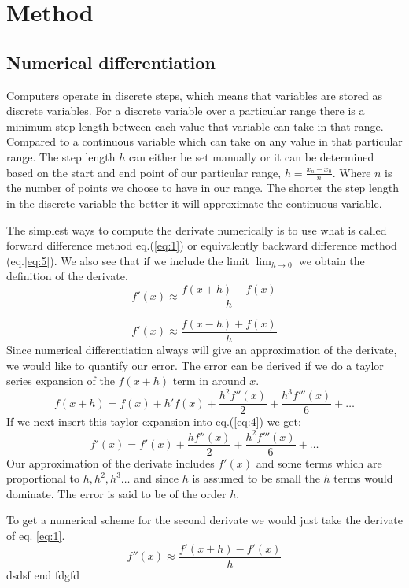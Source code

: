\section*{Method}
\subsection*{Numerical differentiation}
\par Computers operate in discrete steps, which means that variables are stored as discrete variables. For a discrete variable over a particular range there is a minimum step length between each value that variable can take in that range. Compared to a continuous variable which can take on any value in that particular range. The step length $h$ can either be set manually or it can be determined based on the start and end point of our particular range, $h = \frac{x_n -x_0}{n}$. Where $n$ is the number of points we choose to have in our range. The shorter the step length in the discrete variable the better it will approximate the continuous variable.  
\par
The simplest ways to compute the derivate numerically is to use what is called forward difference method eq.(\ref{eq:1}) or equivalently backward difference method (eq.\ref{eq:5}). We also see that if we include the limit $\lim_{h\to 0}$ we obtain the definition of the derivate. 
\begin{equation}\label{eq:1}
    f'(x) \approx \frac{f(x+h)-f(x)}{h}
\end{equation}

\begin{equation}\label{eq:5}
  f'(x) \approx \frac{f(x-h)+f(x)}{h}
\end{equation}
Since numerical differentiation always will give an approximation of the derivate, we would like to quantify our error. The error can be derived if we do a taylor series expansion of the $f(x+h)$ term in around $x$.
\begin{equation}\label{eq:4}
    f(x+h) = f(x) + h'f(x) + \frac{h^2f''(x)}{2} + \frac{h^3f'''(x)}{6} + \dots    
\end{equation}   
If we next insert this taylor expansion into eq.(\ref{eq:4}) we get:
\begin{equation}
  f'(x) = f'(x) + \frac{h f''(x)}{2} + \frac{h^2f'''(x)}{6} + \dots
\end{equation} 
Our approximation of the derivate includes $f'(x)$ and some terms which are proportional to $h, h^2, h^3 \dots $ and since $h$ is assumed to be small the $h$ terms would dominate. The error is said to be of the order $h$. 
\par
To get a numerical scheme for the second derivate we would just take the derivate of eq. \ref{eq:1}. 
\begin{equation}
  f''(x) \approx \frac{f'(x+h)-f'(x)}{h}
\end{equation}
dsdsf end fdgfd
